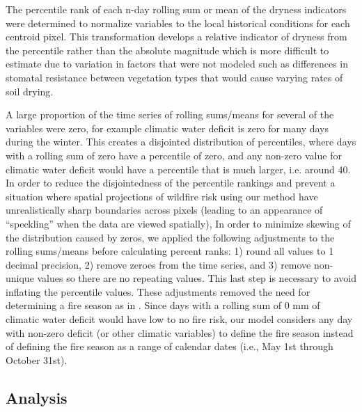 \documentclass[11p]{article}
\begin{document}
The percentile rank of each n-day rolling sum or mean of the dryness indicators were determined to normalize variables to the local historical conditions for each centroid pixel.  This transformation develops a relative indicator of dryness from the percentile rather than the absolute magnitude which is more difficult to estimate due to variation in factors that were not modeled such as differences in stomatal resistance between vegetation types that would cause varying rates of soil drying. 

A large proportion of the time series of rolling sums/means for several of the variables were zero, for example climatic water deficit is zero for many days during the winter. This creates a disjointed distribution of percentiles, where days with a rolling sum of zero have a percentile of zero, and any non-zero value for climatic water deficit would have a percentile that is much larger, i.e. around 40. In order to reduce the disjointedness of the percentile rankings and prevent a situation where spatial projections of wildfire risk using our method have unrealistically sharp boundaries across pixels (leading to an appearance of ``speckling'' when the data are viewed spatially),
In order to minimize skewing of the distribution caused by zeros, we applied the following adjustments to the rolling sums/means before calculating percent ranks: 1) round all values to 1 decimal precision, 2) remove zeroes from the time series, and 3) remove non-unique values so there are no repeating values.  This last step is necessary to avoid inflating the percentile values. These adjustments %
removed the need for determining a fire season as in \citet{thomaWaterBalanceIndicator2020}.  Since days with a rolling sum of 0 mm of climatic water deficit would have low to no fire risk, our model considers any day with non-zero deficit (or other climatic variables) to define the fire season instead of defining the fire season as a range of calendar dates (i.e., May 1st through October 31st).

\subsection{Analysis}
\end{document}
